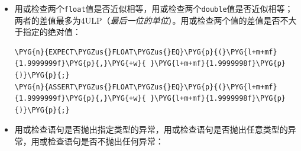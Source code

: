 \begin{itemize}

\item 用或检查两个\texttt{float}值是否近似相等，用或检查两个\texttt{double}值是否近似相等；两者的差值最多为4ULP（\textit{最后一位的单位}）。用或检查两个值的差值是否不大于指定的绝对值：



\begin{codeblockbg}
\begin{Verbatim}[commandchars=\\\{\},breaklines=true,breakanywhere=true,fontsize=\codefont,xleftmargin=17bp]
\PYG{n}{EXPECT\PYGZus{}FLOAT\PYGZus{}EQ}\PYG{p}{(}\PYG{l+m+mf}{1.9999999f}\PYG{p}{,}\PYG{+w}{ }\PYG{l+m+mf}{1.9999998f}\PYG{p}{)}\PYG{p}{;}
\PYG{n}{ASSERT\PYGZus{}FLOAT\PYGZus{}EQ}\PYG{p}{(}\PYG{l+m+mf}{1.9999999f}\PYG{p}{,}\PYG{+w}{ }\PYG{l+m+mf}{1.9999998f}\PYG{p}{)}\PYG{p}{;}
\end{Verbatim}
\end{codeblockbg}



\item 用或检查语句是否抛出指定类型的异常，用或检查语句是否抛出任意类型的异常，用或检查语句是否不抛出任何异常：




\end{itemize}
